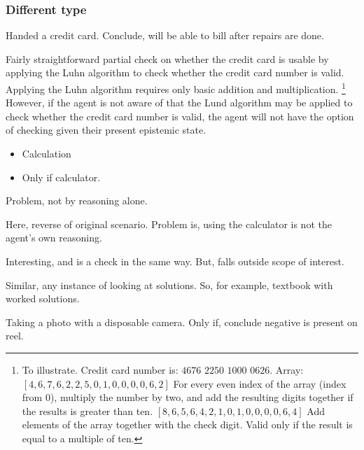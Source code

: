 \subsubsection{Different type}

\begin{note}
  \begin{scenario}
    \label{illu:number-check}
    Handed a credit card.
    Conclude, will be able to bill after repairs are done.
  \end{scenario}

  Fairly straightforward partial check on whether the credit card is usable by applying the Luhn algorithm to check whether the credit card number is valid.
  Applying the Luhn algorithm requires only basic addition and multiplication.%
  \footnote{
    To illustrate.
    Credit card number is:
    \(4676\) \(2250\) \(1000\) \(0626\).
    Array:
    \([4,6,7,6,2,2,5,0,1,0,0,0,0,6,2]\)
    For every even index of the array (index from \(0\)), multiply the number by two, and add the resulting digits together if the results is greater than ten.
    \([8,6,5,6,4,2,1,0,1,0,0,0,0,6,4]\)
    Add elements of the array together with the check digit.
    Valid only if the result is equal to a multiple of ten.
  }
  However, if the agent is not aware of that the Lund algorithm may be applied to check whether the credit card number is valid, the agent will not have the option of checking given their present epistemic state.
\end{note}

\begin{note}[Calculator B]
  \begin{scenario}[Calculator B]
    \mbox{}
    \vspace{-\baselineskip}
    \begin{itemize}
    \item
      Calculation
    \item
      Only if calculator.
    \end{itemize}
  \end{scenario}

  Problem, not by reasoning alone.

  Here, reverse of original scenario.
  Problem is, using the calculator is not the agent's own reasoning.

  Interesting, and is a check in the same way.
  But, falls outside scope of interest.

  Similar, any instance of looking at solutions.
  So, for example, textbook with worked solutions.

  Taking a photo with a disposable camera.
  Only if, conclude negative is present on reel.
\end{note}

